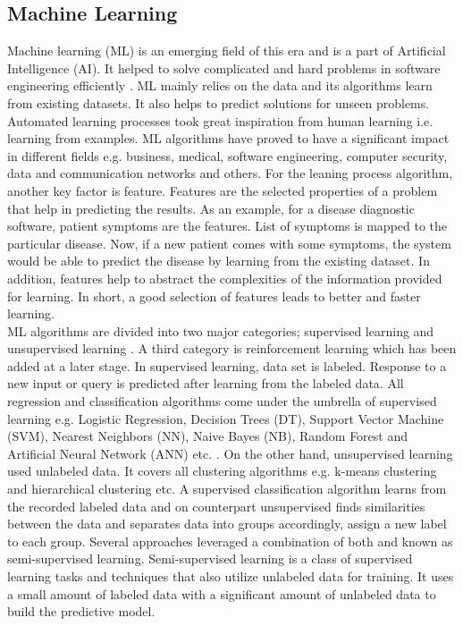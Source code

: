 \subsection {Machine Learning}
Machine learning (ML) is an emerging field of this era
and is a part of Artificial Intelligence (AI). It helped to solve complicated and hard problems in
software engineering efficiently \cite{Zhang2003}. ML mainly relies on the data and its algorithms learn
from existing datasets. It also helps to predict solutions for unseen problems. Automated learning
processes took great inspiration from human learning i.e. learning from examples. ML algorithms
have proved to have a significant impact in different fields e.g. business, medical, software
engineering, computer security, data and communication networks and others. For the leaning
process algorithm, another key factor is feature. Features are the selected properties of a
problem that help in predicting the results. As an example, for a disease diagnostic software,
patient symptoms are the features.  List of symptoms is mapped to the particular disease. Now, if a new patient comes with some symptoms, the system would be able
to predict the disease by learning from the existing dataset. In addition, features help to abstract the complexities of the information
provided for learning. In short, a good selection of features leads to better and faster
learning.\\

	ML algorithms are divided into two major categories; supervised learning and unsupervised
learning \cite{Davis:1993} \cite{kotsiantis2007}. A third category is reinforcement learning which has been added at a
later stage. In supervised learning, data set is labeled. Response to a new input or query
is predicted after learning from the labeled data. All regression and classification
algorithms come under the umbrella of supervised learning e.g. Logistic Regression, Decision
Trees (DT), Support Vector Machine (SVM), Nearest Neighbors (NN), Naive Bayes (NB), Random
Forest and Artificial Neural Network (ANN) etc. \cite{lison2015introduction}. On the other hand, unsupervised learning used unlabeled data. It covers all clustering algorithms e.g. k-means clustering and
hierarchical clustering etc. A supervised classification algorithm learns from the recorded labeled data and on counterpart unsupervised finds similarities between the data and separates data into groups accordingly, assign a new label to each group. Several approaches leveraged a combination of both and known as semi-supervised learning. Semi-supervised learning is a class of supervised learning tasks and techniques that also utilize unlabeled data for training. It uses a small amount of labeled data with a significant amount of unlabeled data to build the predictive model.\cite{SemiSupervisedLearning}